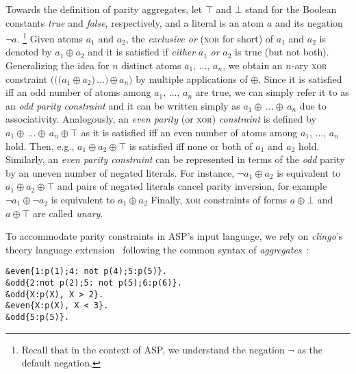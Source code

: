 \documentclass{svproc}
\newcommand{\XOR}{\textsc{xor}} %
\newcommand{\sysfont}{\textit}
\newcommand{\clingo}{\sysfont{clingo}}
\newcommand{\rg}[3]{{#1}{#2}\,\ldots{#2}\,{#3}}
\newcommand{\xor}{\oplus}
\newcommand{\true}{\top}
\newcommand{\false}{\bot}
\begin{document}
Towards the definition of parity aggregates, let $\true$ and $\false$
stand for the Boolean constants \emph{true} and \emph{false},
respectively, and a literal is an atom $a$ and its negation $\neg a$.
\footnote{Recall that in the context of ASP, we understand the negation $\neg$ as the default negation.}
%
Given atoms $a_1$ and $a_2$, the \emph{exclusive or}
(\XOR{} for short) of $a_1$ and $a_2$ is denoted by $a_1\xor a_2$ and
it is satisfied if \emph{either} $a_1$ \emph{or} $a_2$ is true (but
not both).
Generalizing the idea for $n$ distinct atoms
$\rg{a_1}{,}{a_n}$, we obtain an $n$-ary \XOR{} constraint
$\rg{(((a_1\xor a_2}{)}{\xor\,a_n)}$ by multiple applications of
$\xor$. Since it is satisfied iff an odd number of atoms among
$\rg{a_1}{,}{a_n}$ are true,
we can simply refer it to as an \emph{odd parity constraint}
and it can be written simply as
$\rg{a_1}{\xor}{a_n}$ due to associativity.
%
Analogously, an \emph{even parity} (or \XOR{}) \emph{constraint} is defined by
$\rg{a_1}{\xor}{a_n}\xor\true$ as it is satisfied iff an even number
of atoms among $\rg{a_1}{,}{a_n}$ hold. Then, e.g.,
%
$a_1\xor a_2\xor\true$
%
is satisfied iff none or both of $a_1$ and $a_2$ hold.
%
Similarly, an \emph{even parity constraint} can be represented in terms of the \emph{odd} parity by an uneven
number of negated literals.
For instance, $\neg a_1\xor a_2$ is equivalent to $a_1\xor a_2\xor\true$ and pairs of negated literals cancel parity inversion, for example $\neg a_1\xor \neg a_2$ is equivalent to $a_1\xor a_2$
Finally, \XOR{} constraints of forms $a\xor\false$ and $a\xor\true$
are called \emph{unary}.

To accommodate parity constraints in ASP's input language,
we rely on \clingo’s theory language extension~\cite{DBLP:conf/iclp/GebserKKOSW16}
following the common syntax of \emph{aggregates}~\cite{DBLP:journals/tplp/GebserHKLS15}:

\begin{verbatim}
&even{1:p(1);4: not p(4);5:p(5)}.
&odd{2:not p(2);5: not p(5);6:p(6)}.
&odd{X:p(X), X > 2}.
&even{X:p(X), X < 3}.
&odd{5:p(5)}.
\end{verbatim}
\end{document}
